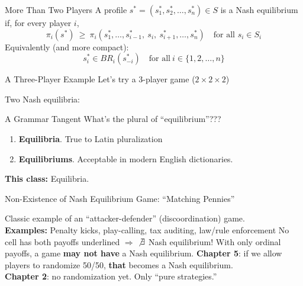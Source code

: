 \begin{frame}{More Than Two Players}
A profile $s^*=(s_1^*,s_2^*,\ldots,s_n^*)\in S$ is a Nash equilibrium if, for every player $i$,
$$\pi_i(s^*)\ \ge\ \pi_i(s_1^*,\ldots,s_{i-1}^*,\ s_i,\ s_{i+1}^*,\ldots,s_n^*)
\quad\text{for all } s_i\in S_i$$
\bsk
Equivalently (and more compact):
$$
    s_i^* \in BR_i(s_{-i}^*) \quad \text{for all}\ i\in\{1,2,\ldots,n\}
$$
\end{frame}

\begin{frame}{A Three-Player Example}
Let's try a 3-player game ($2\times 2\times 2$)\bsk
\centering
\begin{matrixgame}[top={L, R}, left={T, B}, bottom={Player 3: $E$, Player 3: $F$}, h=0.7,
                   player names={Player 1, Player 2, Player 3}, br=<2->]
\end{matrixgame}
\vfill
\raggedright
Two Nash equilibria:
\vspace{-0.3in}
\end{frame}

\begin{frame}{A Grammar Tangent}
\centering
    {\large What's the plural of ``equilibrium''???}
    \bsk
    \begin{enumerate}
        \item \textbf{Equilibria}. True to Latin pluralization
        \item \textbf{Equilibriums}. Acceptable in modern English dictionaries.
    \end{enumerate}
    \bsk
    \textbf{This class:} Equilibria.
\end{frame}

\begin{frame}{Non-Existence of Nash Equilibrium}
Game: ``Matching Pennies''\\
\centering
\begin{matrixgame}[top={H, T}, left={H, T}, player names={Defender, Attacker}, br]
\end{matrixgame}

\raggedright
Classic example of an ``attacker-defender'' (discoordination) game.\\
\textbf{Examples:} Penalty kicks, play-calling, tax auditing, law/rule enforcement
\bsk
No cell has both payoffs underlined $\Rightarrow$ $\not\exists$ Nash equilibrium!
\vfill
With only ordinal payoffs, a game \textbf{may not have} a Nash equilibrium.
\bsk
\textbf{Chapter 5}: if we allow players to randomize 50/50, \textbf{that} becomes a Nash equilibrium.\\
\textbf{Chapter 2}: no randomization yet. Only ``pure strategies.''
\vspace{-0.3in}
\end{frame}

